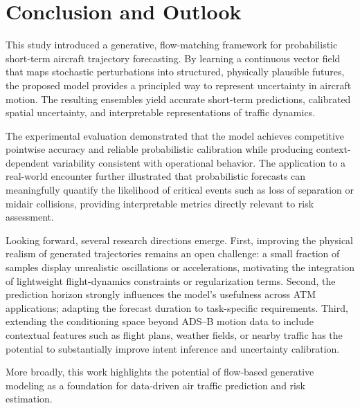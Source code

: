 \documentclass[
  manuscript=proceedings,  %
  layout=preprint,  %
  year=20xx,
  volume=x,
]{extra/joas}
\begin{document}

\section{Conclusion and Outlook}

This study introduced a generative, flow-matching framework for probabilistic short-term aircraft trajectory forecasting.
By learning a continuous vector field that maps stochastic perturbations into structured, physically plausible futures, the proposed model provides a principled way to represent uncertainty in aircraft motion.  
The resulting ensembles yield accurate short-term predictions, calibrated spatial uncertainty, and interpretable representations of traffic dynamics.

The experimental evaluation demonstrated that the model achieves competitive pointwise accuracy and reliable probabilistic calibration while producing context-dependent variability consistent with operational behavior.
The application to a real-world encounter further illustrated that probabilistic forecasts can meaningfully quantify the likelihood of critical events such as loss of separation or midair collisions, providing interpretable metrics directly relevant to risk assessment.

Looking forward, several research directions emerge.  
First, improving the physical realism of generated trajectories remains an open challenge: a small fraction of samples display unrealistic oscillations or accelerations, motivating the integration of lightweight flight-dynamics constraints or regularization terms.  
Second, the prediction horizon strongly influences the model’s usefulness across ATM applications; adapting the forecast duration to task-specific requirements.
Third, extending the conditioning space beyond ADS--B motion data to include contextual features such as flight plans, weather fields, or nearby traffic has the potential to substantially improve intent inference and uncertainty calibration.

More broadly, this work highlights the potential of flow-based generative modeling as a foundation for data-driven air traffic prediction and risk estimation.


\end{document}
